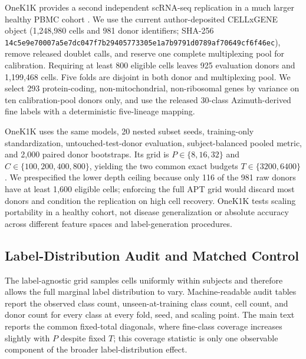 OneK1K provides a second independent scRNA-seq replication in a much larger
healthy PBMC cohort \citep{yazar2022onek1k}. We use the current author-deposited
CELLxGENE object (1{,}248{,}980 cells and 981 donor identifiers; SHA-256
\texttt{14c5e9e70007a5e7dc047f7b29405773305e1a7b9791d0789af70649cf6f46ec}),
remove released doublet calls, and reserve one complete multiplexing pool for
calibration. Requiring at least 800 eligible cells leaves 925 evaluation donors
and 1{,}199{,}468 cells. Five folds are disjoint in both donor and multiplexing
pool. We select 293 protein-coding, non-mitochondrial, non-ribosomal genes by
variance on ten calibration-pool donors only, and use the released 30-class
Azimuth-derived fine labels with a deterministic five-lineage mapping.

OneK1K uses the same models, 20 nested subset seeds, training-only
standardization, untouched-test-donor evaluation, subject-balanced pooled metric, and
2{,}000 paired donor bootstraps. Its grid is
$P\in\{8,16,32\}$ and $C\in\{100,200,400,800\}$, yielding the two common exact
budgets $T\in\{3200,6400\}$. We prespecified the lower depth ceiling because
only 116 of the 981 raw donors have at least 1{,}600 eligible cells; enforcing
the full APT grid would discard most donors and condition the replication on
high cell recovery. OneK1K tests scaling portability in a healthy cohort, not
disease generalization or absolute accuracy across different feature spaces
and label-generation procedures.



\subsection{Label-Distribution Audit and Matched Control}
\label{sec:appendix:class_matched_scaling}

The label-agnostic grid samples cells uniformly within subjects and therefore
allows the full marginal label distribution to vary. Machine-readable audit tables report the
observed class count, unseen-at-training class count, cell count, and donor
count for every class at every fold, seed, and scaling point. The main text
reports the common fixed-total diagonals, where fine-class coverage increases
slightly with $P$ despite fixed $T$; this coverage statistic is only one
observable component of the broader label-distribution effect.

